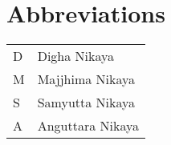 \chapter{Abbreviations}

\begin{tabular}{l l}
D & Digha Nikaya\tabularnewline
M & Majjhima Nikaya\tabularnewline
S & Samyutta Nikaya\tabularnewline
A & Anguttara Nikaya\tabularnewline
\end{tabular}
